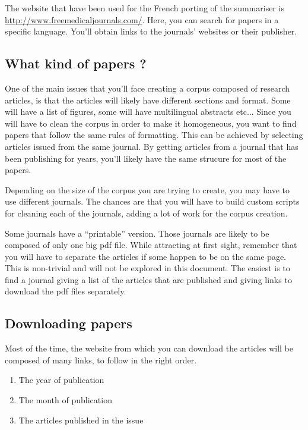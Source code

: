 \documentclass[a4paper,10pt]{article}
\begin{document}
The website that have been used for the French porting of the
summariser is \url{http://www.freemedicaljournals.com/}. Here, you can
search for papers in a specific language. You'll obtain links to the
journals' websites or their publisher.

\subsection{What kind of papers ?}
\label{sec:kindofpaper}

One of the main issues that you'll face creating a corpus composed of
research articles, is that the articles will likely have different
sections and format. Some will have a list of figures, some will have
multilingual abstracts etc... Since you will have to clean the corpus
in order to make it homogeneous, you want to find papers that follow
the same rules of formatting. This can be achieved by selecting
articles issued from the same journal. By getting articles from a
journal that has been publishing for years, you'll likely have the
same strucure for most of the papers.

Depending on the size of the corpus you are trying to create, you may
have to use different journals. The chances are that you will have to
build custom scripts for cleaning each of the journals, adding a lot
of work for the corpus creation.

Some journals have a ``printable'' version. Those journals are likely
to be composed of only one big pdf file. While attracting at first
sight, remember that you will have to separate the articles if some
happen to be on the same page. This is non-trivial and will not be
explored in this document. The easiest is to find a journal giving a
list of the articles that are published and giving links to download
the pdf files separately.

\subsection{Downloading papers}
\label{sec:download}

Most of the time, the website from which you can download the articles
will be composed of many links, to follow in the right order.

\begin{enumerate}
\item The year of publication
\item The month of publication
\item The articles published in the issue
\end{enumerate}
\end{document}

